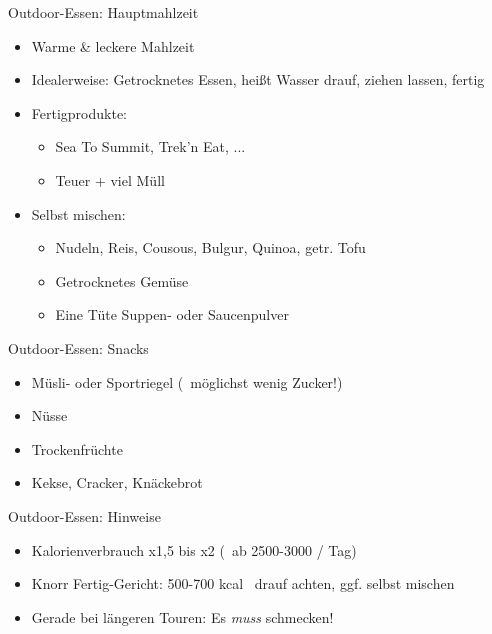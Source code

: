 \documentclass{beamer}
\begin{document}
			\begin{frame}{Outdoor-Essen: Hauptmahlzeit}
				\begin{itemize}
					\item Warme \& leckere Mahlzeit
					\item Idealerweise: Getrocknetes Essen, heißt Wasser drauf, ziehen lassen, fertig
					\item Fertigprodukte:
					\begin{itemize}
						\item Sea To Summit, Trek'n Eat, ...
						\item Teuer + viel Müll
					\end{itemize}
					\item Selbst mischen:
					\begin{itemize}
						\item Nudeln, Reis, Cousous, Bulgur, Quinoa, getr. Tofu
						\item Getrocknetes Gemüse
						\item Eine Tüte Suppen- oder Saucenpulver
					\end{itemize}
				\end{itemize}
			\end{frame}
			
			\begin{frame}{Outdoor-Essen: Snacks}
				\begin{itemize}
					\item Müsli- oder Sportriegel (\textrightarrow\ möglichst wenig Zucker!)
					\item Nüsse
					\item Trockenfrüchte
					\item Kekse, Cracker, Knäckebrot
				\end{itemize}
			\end{frame}
			
			\begin{frame}{Outdoor-Essen: Hinweise}
				\begin{itemize}
					\item Kalorienverbrauch x1,5 bis x2 (\textrightarrow\ ab 2500-3000 / Tag)
					\item Knorr Fertig-Gericht: 500-700 kcal \textrightarrow\ drauf achten, ggf. selbst mischen
					\item Gerade bei längeren Touren: Es \textit{muss} schmecken!
				\end{itemize}
			\end{frame}
			
\end{document}
